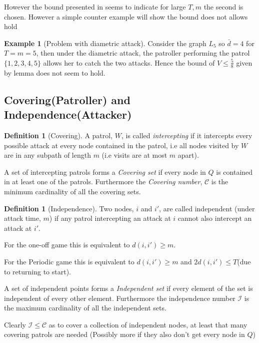 \documentclass[a4paper,10pt]{article}
\theoremstyle{definition}
\newtheorem{definition}[theorem]{Definition}
\theoremstyle{definition}
\newtheorem{example}[theorem]{Example}
\theoremstyle{remark}
\theoremstyle{definition}
\begin{document}
However the bound presented in \citep{Alpern2011} seems to indicate for large $T,m$ the second is chosen. However a simple counter example will show the bound does not allows hold
\begin{example}[Problem with diametric attack]
\label{example:counterexamplediamater} 
Consider the graph $L_{5}$ so $\bar{d}=4$ for $T=m=5$, then under the diametric attack, the patroller performing the patrol $\{ 1,2,3,4,5 \}$ allows her to catch the two attacks. Hence the bound of $V \leq \frac{5}{8}$ given by lemma does not seem to hold. 
\end{example}



\subsection{Covering(Patroller) and Independence(Attacker)}

\begin{definition}[Covering]
A patrol, $W$, is called \textit{intercepting} if it intercepts every possible attack at every node contained in the patrol, i.e all nodes visited by $W$ are in any subpath of length $m$ (i.e visits are at most $m$ apart).

A set of intercepting patrols forms a \textit{Covering set} if every node in $Q$ is contained in at least one of the patrols. Furthermore the \textit{Covering number}, $\mathcal{C}$ is the minimum cardinality of all the covering sets.
\end{definition}

\begin{definition}[Independence]
Two nodes, $i$ and $i'$, are called independent (under attack time, $m$) if any patrol intercepting an attack at $i$ cannot also intercept an attack at $i'$.

For the one-off game this is equivalent to $d(i,i') \geq m$.

For the Periodic game this is equivalent to $d(i,i') \geq m$ and $2d(i,i') \leq T$(due to returning to start).

A set of independent points forms a \textit{Independent set} if every element of the set is independent of every other element. Furthermore the independence number $\mathcal{I}$ is the maximum cardinality of all the independent sets.
\end{definition}

Clearly $\mathcal{I} \leq \mathcal{C}$ as to cover a collection of independent nodes, at least that many covering patrols are needed (Possibly more if they also don't get every node in $Q$)
\end{document}
